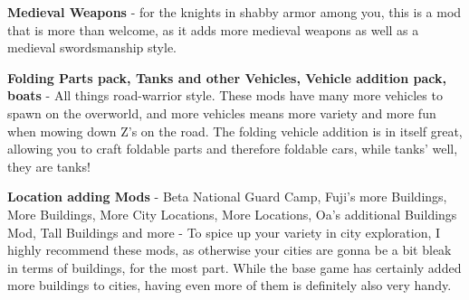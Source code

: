 \textbf{Medieval Weapons} - for the knights in shabby armor among you, this is a mod that is more than welcome, as it adds more medieval weapons as well as a medieval swordsmanship style.

\textbf{Folding Parts pack, Tanks and other Vehicles, Vehicle addition pack, boats} - All things road-warrior style. These mods have many more vehicles to spawn on the overworld, and more vehicles means more variety and more fun when mowing down Z's on the road. The folding vehicle addition is in itself great, allowing you to craft foldable parts and therefore foldable cars, while tanks' well, they are tanks!

\textbf{Location adding Mods} - Beta National Guard Camp, Fuji's more Buildings, More Buildings, More City Locations, More Locations, Oa's additional Buildings Mod, Tall Buildings and more - To spice up your variety in city exploration, I highly recommend these mods, as otherwise your cities are gonna be a bit bleak in terms of buildings, for the most part. While the base game has certainly added more buildings to cities, having even more of them is definitely also very handy.